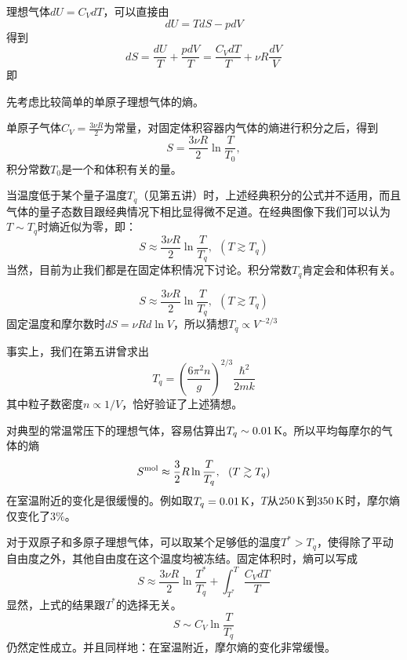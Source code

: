 \documentclass[CJK]{beamer}
\begin{document}
\begin{frame}
  \bch
  理想气体$dU = C_V dT$，可以直接由
  $$ dU = TdS - pdV$$
  得到
  $$ dS = \frac{dU}{T} + \frac{pdV}{T} = \frac{C_VdT}{T} + \nu R\frac{dV}{V}$$
  即
  \ech
\end{frame}

\begin{frame}
  \bch
  先考虑比较简单的单原子理想气体的熵。

  
  单原子气体$C_V=\frac{3\nu R}{2}$为常量，对固定体积容器内气体的熵进行积分之后，得到
  $$ S  = \frac{3\nu R}{2} \ln\frac{T}{T_0}, $$
  积分常数$T_0$是一个和体积有关的量。
  
  当温度低于某个量子温度$T_q$（见第五讲）时，上述经典积分的公式并不适用，而且气体的量子态数目跟经典情况下相比显得微不足道。在经典图像下我们可以认为$T\sim T_q$时熵近似为零，即：
  $$S \approx \frac{3\nu R}{2} \ln\frac{T}{T_q},\ \ (T\gtrsim T_q)$$
  当然，目前为止我们都是在固定体积情况下讨论。积分常数$T_q$肯定会和体积有关。
   
  \ech
\end{frame}

\begin{frame}
  \bch
  $$S \approx \frac{3\nu R}{2} \ln\frac{T}{T_q},\ \ (T\gtrsim T_q)$$  
  固定温度和摩尔数时$dS = \nu R d\ln V$，所以猜想$T_q \propto V^{-2/3}$

  事实上，我们在第五讲曾求出
  $$T_q = \left(\frac{6\pi^2 n}{ g}\right)^{2/3} \frac{\hbar^2}{2mk}$$
  其中粒子数密度$n\propto 1/V$，恰好验证了上述猜想。

  对典型的常温常压下的理想气体，容易估算出$T_q\sim 0.01\,\mathrm{K}$。所以平均每摩尔的气体的熵
  $$S^{\rm mol} \approx \frac{3}{2}R\ln\frac{T}{T_q},\ \ (T\gtrsim T_q)$$
  在室温附近的变化是很缓慢的。例如取$T_q = 0.01\,\mathrm{K}$，$T$从$250\,\mathrm{K}$到$350\,\mathrm{K}$时，摩尔熵仅变化了$3\%$。
  \ech
\end{frame}


\begin{frame}
  \bch
  对于双原子和多原子理想气体，可以取某个足够低的温度$T^*> T_q$，使得除了平动自由度之外，其他自由度在这个温度均被冻结。固定体积时，熵可以写成
  $$S \approx \frac{3\nu R}{2} \ln\frac{T^*}{T_q} + \int_{T^*}^T \frac{C_VdT}{T}$$
  显然，上式的结果跟$T^*$的选择无关。
  $$ S \sim C_V\ln\frac{T}{T_q}$$
  仍然定性成立。并且同样地：{\blue 在室温附近，摩尔熵的变化非常缓慢}。
  \ech
\end{frame}
\end{document}
